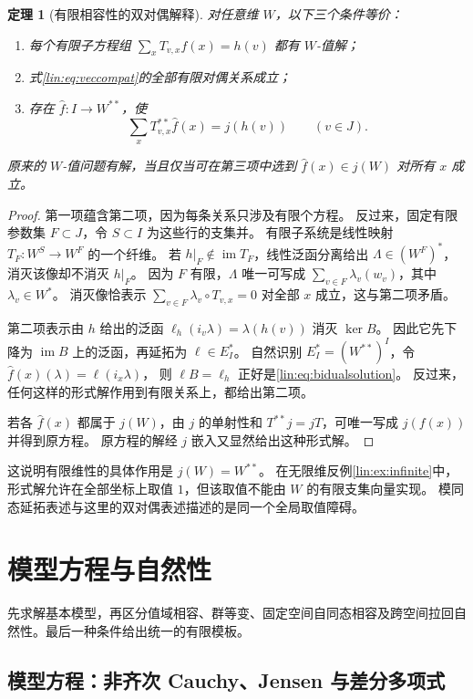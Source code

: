 \documentclass[11pt,a4paper,oneside,openany]{book}
\theoremstyle{lecture}
\newtheorem{theorem}{定理}[section]
\newcommand{\im}{\operatorname{im}}
\numberwithin{equation}{section}
\begin{document}
\begin{theorem}[有限相容性的双对偶解释]\label{lin:thm:bidual}
对任意维 $W$，以下三个条件等价：
\begin{enumerate}
\item 每个有限子方程组 $\sum_xT_{v,x}f(x)=h(v)$ 都有 $W$-值解；
\item 式\eqref{lin:eq:veccompat}的全部有限对偶关系成立；
\item 存在 $\widehat f:I\to W^{**}$，使
\begin{equation}\label{lin:eq:bidualsolution}
 \sum_xT_{v,x}^{**}\widehat f(x)=j(h(v))\qquad(v\in J).
\end{equation}
\end{enumerate}
原来的 $W$-值问题有解，当且仅当可在第三项中选到 $\widehat f(x)\in j(W)$ 对所有 $x$ 成立。
\end{theorem}
\begin{proof}
第一项蕴含第二项，因为每条关系只涉及有限个方程。
反过来，固定有限参数集 $F\subset J$，令 $S\subset I$ 为这些行的支集并。
有限子系统是线性映射
$T_F:W^S\to W^F$ 的一个纤维。
若 $h|_F\notin\im T_F$，线性泛函分离给出 $\Lambda\in(W^F)^*$，消灭该像却不消灭 $h|_F$。
因为 $F$ 有限，$\Lambda$ 唯一可写成 $\sum_{v\in F}\lambda_v(w_v)$，其中 $\lambda_v\in W^*$。
消灭像恰表示 $\sum_{v\in F}\lambda_v\circ T_{v,x}=0$ 对全部 $x$ 成立，这与第二项矛盾。

第二项表示由 $h$ 给出的泛函 $\ell_h(i_v\lambda)=\lambda(h(v))$ 消灭 $\ker B$。
因此它先下降为 $\im B$ 上的泛函，再延拓为 $\ell\in E_I^*$。
自然识别 $E_I^*=(W^{**})^I$，令 $\widehat f(x)(\lambda)=\ell(i_x\lambda)$，
则 $\ell B=\ell_h$ 正好是\eqref{lin:eq:bidualsolution}。
反过来，任何这样的形式解作用到有限关系上，都给出第二项。

若各 $\widehat f(x)$ 都属于 $j(W)$，由 $j$ 的单射性和 $T^{**}j=jT$，可唯一写成 $j(f(x))$ 并得到原方程。
原方程的解经 $j$ 嵌入又显然给出这种形式解。
\end{proof}

这说明有限维性的具体作用是 $j(W)=W^{**}$。
在无限维反例\ref{lin:ex:infinite}中，形式解允许在全部坐标上取值 $1$，但该取值不能由 $W$ 的有限支集向量实现。
模同态延拓表述与这里的双对偶表述描述的是同一个全局取值障碍。


\chapter{模型方程与自然性}\label{ch:natural}
先求解基本模型，再区分值域相容、群等变、固定空间自同态相容及跨空间拉回自然性。最后一种条件给出统一的有限模板。
\section{模型方程：非齐次 Cauchy、Jensen 与差分多项式}\label{lin:sec:models}
\end{document}
